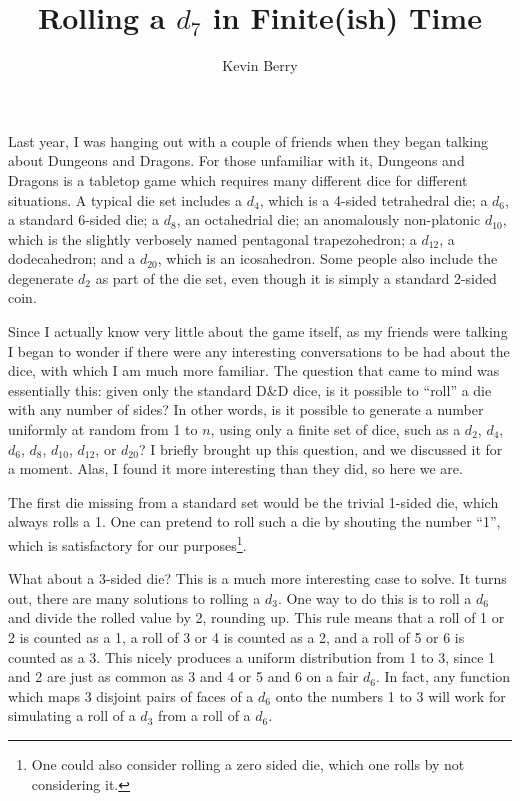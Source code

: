 \documentclass{article}
\title{Rolling a $d_7$ in Finite(ish) Time}
\author{Kevin Berry}
\begin{document}
\maketitle

\par Last year, I was hanging out with a couple of friends when they began talking about Dungeons and Dragons.
For those unfamiliar with it, Dungeons and Dragons is a tabletop game which requires many different dice for different situations. 
A typical die set includes a $d_4$, which is a 4-sided tetrahedral die; a $d_6$, a standard 6-sided die; a $d_8$, an octahedrial die; an anomalously non-platonic $d_{10}$, which is the slightly verbosely named pentagonal trapezohedron; a $d_{12}$, a dodecahedron; and a $d_{20}$, which is an icosahedron.
Some people also include the degenerate $d_2$ as part of the die set, even though it is simply a standard 2-sided coin.

\par Since I actually know very little about the game itself, as my friends were talking I began to wonder if there were any interesting conversations to be had about the dice, with which I am much more familiar.
The question that came to mind was essentially this: given only the standard D\&D dice, is it possible to ``roll'' a die with any number of sides? 
In other words, is it possible to generate a number uniformly at random from 1 to $n$, using only a finite set of dice, such as a $d_2$, $d_4$, $d_6$, $d_8$, $d_{10}$, $d_{12}$, or $d_{20}$?
I briefly brought up this question, and we discussed it for a moment.
Alas, I found it more interesting than they did, so here we are.

\par The first die missing from a standard set would be the trivial 1-sided die, which always rolls a 1.
One can pretend to roll such a die by shouting the number ``1'', which is satisfactory for our purposes\footnote{One could also consider rolling a zero sided die, which one rolls by not considering it.}.

\par What about a 3-sided die?
This is a much more interesting case to solve.
It turns out, there are many solutions to rolling a $d_3$.
One way to do this is to roll a $d_6$ and divide the rolled value by 2, rounding up.
This rule means that a roll of 1 or 2 is counted as a 1, a roll of 3 or 4 is counted as a 2, and a roll of 5 or 6 is counted as a 3.
This nicely produces a uniform distribution from 1 to 3, since 1 and 2 are just as common as 3 and 4 or 5 and 6 on a fair $d_6$.
In fact, any function which maps 3 disjoint pairs of faces of a $d_6$ onto the numbers 1 to 3 will work for simulating a roll of a $d_3$ from a roll of a $d_6$.
\end{document}
